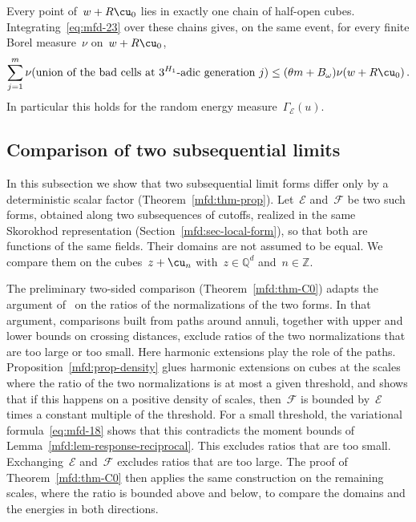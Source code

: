 \documentclass[11pt]{amsart}
\begin{document}
Every point of~$w+R\cu_0$ lies in exactly one chain of half-open cubes. Integrating~\eqref{eq:mfd-23} over these chains gives, on the same event, for every finite Borel measure~$\nu$ on~$w+R\cu_0$,
\begin{equation}
	\sum_{j=1}^m\nu(\text{union of the bad cells at~$3^{H_1}$-adic generation }j)
	\leq(\theta m+B_\omega)\nu(w+R\cu_0)\,.
	\label{eq:mfd-24}
\end{equation}
In particular this holds for the random energy measure~$\Gamma_{\mathscr E}(u)$.

\subsection{Comparison of two subsequential limits}
\label{mfd:sec-compare}

In this subsection we show that two subsequential limit forms differ only by a deterministic scalar factor (Theorem~\ref{mfd:thm-prop}). Let~$\mathscr E$ and~$\mathscr F$ be two such forms, obtained along two subsequences of cutoffs, realized in the same Skorokhod representation (Section~\ref{mfd:sec-local-form}), so that both are functions of the same fields. Their domains are not assumed to be equal. We compare them on the cubes~$z+\cu_n$ with~$z\in\mathbb Q^d$ and~$n\in\mathbb Z$.

\smallskip

The preliminary two-sided comparison (Theorem~\ref{mfd:thm-C0}) adapts the argument of~\citet[Section~3.4]{DGComparison} on the ratios of the normalizations of the two forms. In that argument, comparisons built from paths around annuli, together with upper and lower bounds on crossing distances, exclude ratios of the two normalizations that are too large or too small. Here harmonic extensions play the role of the paths. Proposition~\ref{mfd:prop-density} glues harmonic extensions on cubes at the scales where the ratio of the two normalizations is at most a given threshold, and shows that if this happens on a positive density of scales, then~$\mathscr F$ is bounded by~$\mathscr E$ times a constant multiple of the threshold. For a small threshold, the variational formula~\eqref{eq:mfd-18} shows that this contradicts the moment bounds of Lemma~\ref{mfd:lem-response-reciprocal}. This excludes ratios that are too small. Exchanging~$\mathscr E$ and~$\mathscr F$ excludes ratios that are too large. The proof of Theorem~\ref{mfd:thm-C0} then applies the same construction on the remaining scales, where the ratio is bounded above and below, to compare the domains and the energies in both directions.
\end{document}
